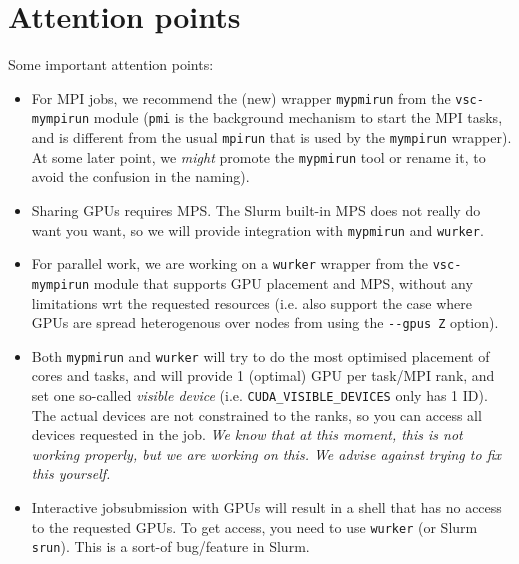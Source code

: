 



\section{Attention points}
\label{sec:gpu_ugent_attention_points}

Some important attention points:

\begin{itemize}
\item For MPI jobs, we recommend the (new) wrapper \lstinline|mypmirun| from the \lstinline|vsc-mympirun| module
  (\lstinline|pmi| is the background mechanism to start the MPI tasks,
  and is different from the usual \lstinline|mpirun| that is used by the \lstinline|mympirun| wrapper).
  At some later point, we \emph{might} promote the \lstinline|mypmirun| tool or rename it,
  to avoid the confusion in the naming).
\item Sharing GPUs requires MPS. The Slurm built-in MPS does not really do want you want, so we will provide integration with
  \lstinline|mypmirun| and \lstinline|wurker|.
\item For parallel work, we are working on a \lstinline|wurker| wrapper from the \lstinline|vsc-mympirun| module that supports
  GPU placement and MPS, without any limitations wrt the requested resources (i.e. also support the case where GPUs
  are spread heterogenous over nodes from using the \lstinline|--gpus Z| option).
\item Both \lstinline|mypmirun| and \lstinline|wurker| will try to do the most optimised placement of cores and tasks, and
  will provide 1 (optimal) GPU per task/MPI rank, and set one so-called \emph{visible device}
  (i.e. \lstinline|CUDA_VISIBLE_DEVICES| only has 1 ID). The actual devices are not constrained to the ranks,
  so you can access all devices requested in the job.
  \emph{We know that at this moment, this is not working properly, but we are working on this. We advise against trying to fix this yourself.}
\item Interactive jobsubmission with GPUs will result in a shell that has no access to the requested GPUs. To get access, you need to use
  \lstinline|wurker| (or Slurm \lstinline|srun|). This is a sort-of bug/feature in Slurm.
\end{itemize}

